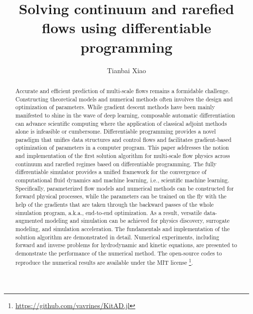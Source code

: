 \documentclass[preprint,3p,12pt,sort&compress]{elsarticle}
\begin{document}
\title{Solving continuum and rarefied flows using differentiable programming}

\author[IMECH,UCAS]{Tianbai Xiao}

\address[IMECH]{State Key Laboratory of High Temperature Gas Dynamics and Centre for Interdisciplinary Research in Fluids, Institute of Mechanics, Chinese Academy of Sciences, Beijing, China}
\address[UCAS]{School of Engineering Science, University of Chinese Academy of Sciences, Beijing, China}

\begin{abstract}
    Accurate and efficient prediction of multi-scale flows remains a formidable challenge.
    Constructing theoretical models and numerical methods often involves the design and optimization of parameters.
    While gradient descent methods have been mainly manifested to shine in the wave of deep learning, composable automatic differentiation can advance scientific computing where the application of classical adjoint methods alone is infeasible or cumbersome.
    Differentiable programming provides a novel paradigm that unifies data structures and control flows and facilitates gradient-based optimization of parameters in a computer program.
    This paper addresses the notion and implementation of the first solution algorithm for multi-scale flow physics across continuum and rarefied regimes based on differentiable programming.
    The fully differentiable simulator provides a unified framework for the convergence of computational fluid dynamics and machine learning, i.e., scientific machine learning.
    Specifically, parameterized flow models and numerical methods can be constructed for forward physical processes, while the parameters can be trained on the fly with the help of the gradients that are taken through the backward passes of the whole simulation program, a.k.a., end-to-end optimization.
    As a result, versatile data-augmented modeling and simulation can be achieved for physics discovery, surrogate modeling, and simulation acceleration.
    The fundamentals and implementation of the solution algorithm are demonstrated in detail.
    Numerical experiments, including forward and inverse problems for hydrodynamic and kinetic equations, are presented to demonstrate the performance of the numerical method.
    The open-source codes to reproduce the numerical results are available under the MIT license \footnote{\url{https://github.com/vavrines/KitAD.jl}}. 
\end{abstract}
\end{document}
